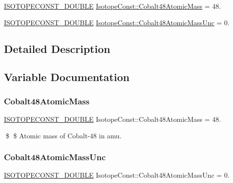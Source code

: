 \begin{DoxyCompactItemize}
\item 
\mbox{\hyperlink{group___isotope_const-_macros_ga8f45a7272ce02c0b4c65c44636ed719a}{I\+S\+O\+T\+O\+P\+E\+C\+O\+N\+S\+T\+\_\+\+D\+O\+U\+B\+LE}} \mbox{\hyperlink{group___isotope_const-_cobalt-_co48_ga691cf0f53cc2da64827718f04a85a95f}{Isotope\+Const\+::\+Cobalt48\+Atomic\+Mass}} = 48.
\item 
\mbox{\hyperlink{group___isotope_const-_macros_ga8f45a7272ce02c0b4c65c44636ed719a}{I\+S\+O\+T\+O\+P\+E\+C\+O\+N\+S\+T\+\_\+\+D\+O\+U\+B\+LE}} \mbox{\hyperlink{group___isotope_const-_cobalt-_co48_gae8d3eab64caddc5723a6eb54a70aaf21}{Isotope\+Const\+::\+Cobalt48\+Atomic\+Mass\+Unc}} = 0.
\end{DoxyCompactItemize}


\subsection{Detailed Description}


\subsection{Variable Documentation}
\mbox{\label{group___isotope_const-_cobalt-_co48_ga691cf0f53cc2da64827718f04a85a95f}} 
\subsubsection{\texorpdfstring{Cobalt48\+Atomic\+Mass}{Cobalt48AtomicMass}}
{\footnotesize\ttfamily \mbox{\hyperlink{group___isotope_const-_macros_ga8f45a7272ce02c0b4c65c44636ed719a}{I\+S\+O\+T\+O\+P\+E\+C\+O\+N\+S\+T\+\_\+\+D\+O\+U\+B\+LE}} Isotope\+Const\+::\+Cobalt48\+Atomic\+Mass = 48.}

\$ \$ Atomic mass of Cobalt-\/48 in amu. \mbox{\label{group___isotope_const-_cobalt-_co48_gae8d3eab64caddc5723a6eb54a70aaf21}} 
\subsubsection{\texorpdfstring{Cobalt48\+Atomic\+Mass\+Unc}{Cobalt48AtomicMassUnc}}
{\footnotesize\ttfamily \mbox{\hyperlink{group___isotope_const-_macros_ga8f45a7272ce02c0b4c65c44636ed719a}{I\+S\+O\+T\+O\+P\+E\+C\+O\+N\+S\+T\+\_\+\+D\+O\+U\+B\+LE}} Isotope\+Const\+::\+Cobalt48\+Atomic\+Mass\+Unc = 0.}

